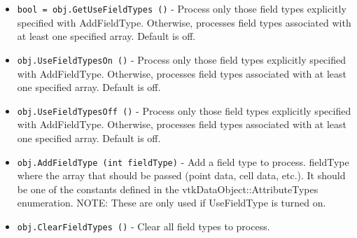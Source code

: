 \begin{itemize}
\item  \verb|bool = obj.GetUseFieldTypes ()| -  Process only those field types explicitly specified with AddFieldType.
 Otherwise, processes field types associated with at least one specified
 array. Default is off.

\item  \verb|obj.UseFieldTypesOn ()| -  Process only those field types explicitly specified with AddFieldType.
 Otherwise, processes field types associated with at least one specified
 array. Default is off.

\item  \verb|obj.UseFieldTypesOff ()| -  Process only those field types explicitly specified with AddFieldType.
 Otherwise, processes field types associated with at least one specified
 array. Default is off.

\item  \verb|obj.AddFieldType (int fieldType)| -  Add a field type to process.
 fieldType where the array that should be passed (point data, cell data, etc.).
 It should be one of the constants defined in the vtkDataObject::AttributeTypes
 enumeration.
 NOTE: These are only used if UseFieldType is turned on.

\item  \verb|obj.ClearFieldTypes ()| -  Clear all field types to process.

\end{itemize}
